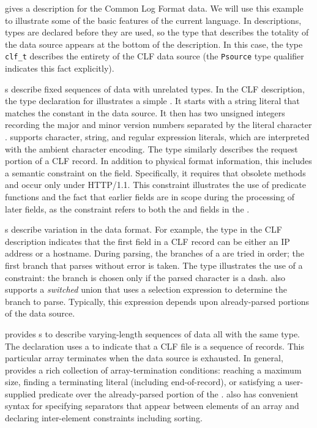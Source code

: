  gives a \pads{} description for the Common Log Format
data.  
We will use this example to illustrate some of the basic
features of the current \pads{} language.  
In \pads{} descriptions, types are declared before they are used, 
so the type that describes the totality of the data source appears 
at the bottom of the description.  
In this case,
the type \texttt{clf\_t}  describes the entirety of the
CLF data source (the \texttt{Psource} type qualifier indicates
this fact explicitly).  

s describe fixed sequences of data with unrelated types.
In the CLF description, the type declaration for
 illustrates a simple . It starts with a 
string literal that matches the constant  in the data source.  It 
then has two unsigned integers recording the major and minor version numbers
separated by the literal character .  \pads{} supports character, string,
and regular expression literals, which are interpreted with the ambient character 
encoding. The type  
similarly describes the request portion of a CLF record.  In addition
to physical format information, this  includes a semantic constraint
on the  field.  Specifically, it requires that obsolete methods
 and  occur only under HTTP/1.1.  This constraint illustrates
the use of predicate functions and the fact 
that earlier fields are in scope during the processing of later fields, as the 
constraint
refers to both the  and  fields in the .

s describe variation in the data format.  For example, the
 type in the CLF description indicates that the first
field in a CLF record can be either an IP address or a hostname.
During parsing, the branches of a  are tried in order; the
first branch that parses without error is taken.  The 
type illustrates the use of a constraint: the branch 
is chosen only if the parsed character is a dash.  \pads{} also
supports a \textit{switched} union that uses a selection expression to
determine the branch to parse.  Typically, this expression depends
upon already-parsed portions of the data source.

\pads{} provides s to describe varying-length sequences of
data all with the same type.  The  declaration  uses a
 to indicate that a CLF file is a sequence of 
records.  This particular array terminates when the data source is
exhausted. In general, \pads{} provides a rich
collection of array-termination conditions: reaching a maximum size,
finding a terminating literal (including end-of-record), or satisfying a
user-supplied predicate over the already-parsed portion of the . 
\pads{} also has convenient syntax for 
specifying separators that appear between elements of an array and
declaring inter-element constraints including sorting.

